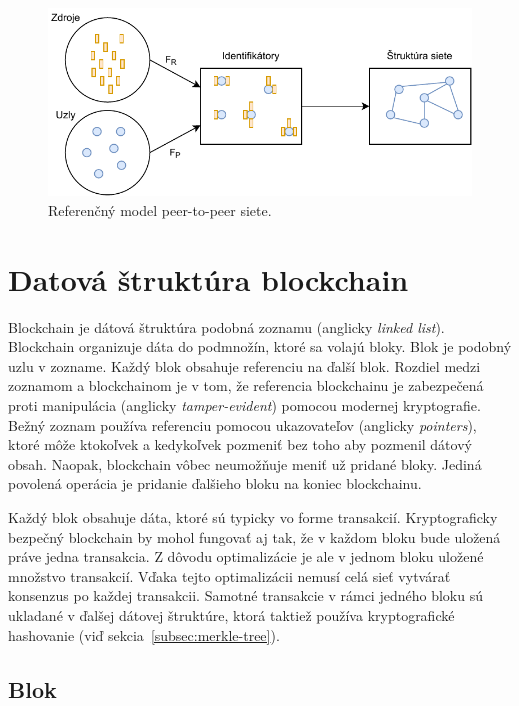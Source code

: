 \begin{figure}[bt]
	\centering
	\includegraphics[width=\textwidth]{obrazky-figures/p2p-ref-model.pdf}
	\caption{Referenčný model peer-to-peer siete.~\cite{p2pEssence}}
	\label{img:p2p-ref-model}
\end{figure}

\section{Datová štruktúra blockchain}\label{sec:data-struct-blockchain}
Blockchain je dátová štruktúra podobná zoznamu (anglicky \textit{linked list}). Blockchain organizuje dáta do podmnožín, ktoré sa volajú bloky. Blok je podobný uzlu v zozname. Každý blok obsahuje referenciu na ďalší blok. Rozdiel medzi zoznamom a blockchainom je v tom, že referencia blockchainu je zabezpečená proti manipulácia (anglicky \textit{tamper-evident}) pomocou modernej kryptografie. Bežný zoznam používa referenciu pomocou ukazovateľov (anglicky \textit{pointers}), ktoré môže ktokoľvek a kedykoľvek pozmeniť bez toho aby pozmenil dátový obsah. Naopak, blockchain vôbec neumožňuje meniť už pridané bloky. Jediná povolená operácia je pridanie ďalšieho bloku na koniec blockchainu.~\cite{horizenAcademy}

Každý blok obsahuje dáta, ktoré sú typicky vo forme transakcií. Kryptograficky bezpečný blockchain by mohol fungovať aj tak, že v každom bloku bude uložená práve jedna transakcia. Z dôvodu optimalizácie je ale v jednom bloku uložené množstvo transakcií. Vďaka tejto optimalizácii nemusí celá sieť vytvárať konsenzus po každej transakcii. Samotné transakcie v rámci jedného bloku sú ukladané v ďalšej dátovej štruktúre, ktorá taktiež používa kryptografické hashovanie (viď sekcia~\ref{subsec:merkle-tree}).~\cite{narayanan2016bitcoin}

\subsection{Blok}\label{subsec:block}


